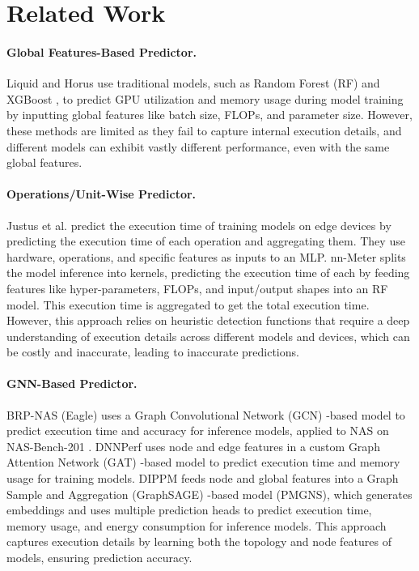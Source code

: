 
\section{Related Work} \label{sec:related work} 
\paragraph{Global Features-Based Predictor.} 
Liquid \cite{Liquid} and Horus \cite{Horus} use traditional models, such as Random Forest (RF) \cite{randomforest} and XGBoost \cite{Xgboost}, to predict GPU utilization and memory usage during model training by inputting global features like batch size, FLOPs, and parameter size. However, these methods are limited as they fail to capture internal execution details, and different models can exhibit vastly different performance, even with the same global features.

\paragraph{Operations/Unit-Wise Predictor.}
Justus et al. \cite{justus} predict the execution time of training models on edge devices by predicting the execution time of each operation and aggregating them. They use hardware, operations, and specific features as inputs to an MLP. nn-Meter \cite{Nn-meter} splits the model inference into kernels, predicting the execution time of each by feeding features like hyper-parameters, FLOPs, and input/output shapes into an RF model. This execution time is aggregated to get the total execution time. However, this approach relies on heuristic detection functions that require a deep understanding of execution details across different models and devices, which can be costly and inaccurate, leading to inaccurate predictions.

\paragraph{GNN-Based Predictor.}
BRP-NAS (Eagle) \cite{Brp-nas} uses a Graph Convolutional Network (GCN) \cite{GCN}-based model to predict execution time and accuracy for inference models, applied to NAS on NAS-Bench-201 \cite{nas-bench}. 
DNNPerf \cite{dnnperf} uses node and edge features in a custom Graph Attention Network (GAT) \cite{GAT}-based model to predict execution time and memory usage for training models. 
DIPPM \cite{DIPPM} feeds node and global features into a Graph Sample and Aggregation (GraphSAGE) \cite{GraphSage}-based model (PMGNS), which generates embeddings and uses multiple prediction heads to predict execution time, memory usage, and energy consumption for inference models. 
This approach captures execution details by learning both the topology and node features of models, ensuring prediction accuracy.
